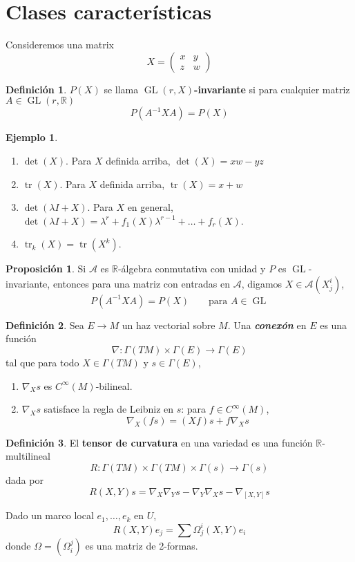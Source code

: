 \documentclass[spanish]{book}
\theoremstyle{definition}
\newtheorem*{defn}{Definición}
\newtheorem*{prop}{Proposición}
\newtheorem*{ejem}{Ejemplo}
\newcommand{\R}{\mathbb{R}}
\begin{document}
	\section{Clases características}
	Consideremos una matrix
	\[X=\begin{pmatrix}
		x&y\\
		z&w
	\end{pmatrix}\]
	\begin{defn}
		$P(X)$ se llama \textbf{$\operatorname{GL}(r,X)$-invariante} si para cualquier matriz $A\in\operatorname{GL}(r,\R)$
		\[P(A^{-1}XA)=P(X)\]
	\end{defn}
	\begin{ejem}\leavevmode
		\begin{enumerate}
			\item $\det(X)$. Para $X$ definida arriba, $\det(X)=xw-yz$
			\item $\operatorname{tr}(X)$. Para $X$ definida arriba, $\operatorname{tr}(X)=x+w$
			\item $\det(\lambda I+X)$. Para $X$ en general, $\det(\lambda I+X)=\lambda^r+f_1(X)\lambda^{r-1}+\ldots+f_r(X)$.
			\item $\operatorname{tr}_k(X)=\operatorname{tr}(X^k)$.
		\end{enumerate}
	\end{ejem}
	
	\begin{prop}
		Si $\mathcal{A}$ es $\R$-álgebra conmutativa con unidad y $P$ es $\operatorname{GL}$-invariante, entonces para una matriz con entradas en $\mathcal{A}$, digamos $X\in\mathcal{A}(X^i_j)$,
		\[P(A^{-1}XA)=P(X)\qquad \text{para }A\in\operatorname{GL}\]
	\end{prop}
\begin{defn}
	Sea $E\to M$ un haz vectorial sobre $M$. Una \textbf{\textit{conexón}} en $E$ es una función
	\[\nabla:\Gamma(TM)\times\Gamma(E)\to \Gamma(E)\]
	tal que para todo $X\in\Gamma(TM)$ y $s\in\Gamma(E)$,
	\begin{enumerate}
		\item $\nabla_Xs$ es $C^\infty(M)$-bilineal.
		\item $\nabla_Xs$ satisface la regla de Leibniz en $s$: para $f\in C^\infty(M)$,
		\[\nabla_X(fs)=(Xf)s+f\nabla_Xs\]
	\end{enumerate}
\end{defn}
\begin{defn}
	El \textbf{tensor de curvatura} en una variedad es una función $\R$-multilineal
	\[R:\Gamma(TM)\times\Gamma(TM)\times\Gamma(s)\to\Gamma(s)\]
	dada por
	\[R(X,Y)s=\nabla_X\nabla_Y s-\nabla_Y\nabla_Xs-\nabla_{[X,Y]}s\]
\end{defn}
Dado un marco local $e_1,\ldots,e_k$ en $U$,
\[R(X,Y)e_j=\sum\Omega_j^i(X,Y)e_i\]
donde $\Omega=(\Omega^j_i)$ es una matriz de 2-formas.
\end{document}

